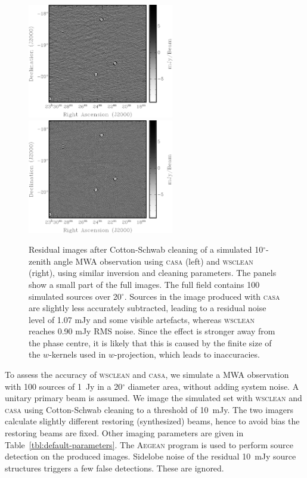 \documentclass[useAMS,usenatbib]{mn2e}
\newcommand{\degree}{\ensuremath{^{\circ}}\xspace}
\begin{document}
\begin{figure}
\begin{center}
\includegraphics[height=5cm]{img/residual-casa-fixed-grayscale}\hspace{1cm}\includegraphics[height=5cm]{img/residual-wsclean}
\caption{Residual images after Cotton-Schwab cleaning of a simulated 10\degree-zenith angle MWA observation using \textsc{casa} (left) and \textsc{wsclean} (right), using similar inversion and cleaning parameters. The panels show a small part of the full images. The full field contains 100 simulated sources over 20\degree. Sources in the image produced with \textsc{casa} are slightly less accurately subtracted, leading to a residual noise level of 1.07 mJy and some visible artefacts, whereas \textsc{wsclean} reaches 0.90 mJy RMS noise. Since the effect is stronger away from the phase centre, it is likely that this is caused by the finite size of the $w$-kernels used in $w$-projection, which leads to inaccuracies.}
\label{fig:residuals}
\end{center}
\end{figure}

To assess the accuracy of \textsc{wsclean} and \textsc{casa}, we simulate a MWA observation with 100 sources of 1~Jy in a 20\degree diameter area, without adding system noise. A unitary primary beam is assumed. We image the simulated set with \textsc{wsclean} and \textsc{casa} using Cotton-Schwab cleaning to a threshold of 10~mJy. The two imagers calculate slightly different restoring (synthesized) beams, hence to avoid bias the restoring beams are fixed. Other imaging parameters are given in Table~\ref{tbl:default-parameters}. The \textsc{Aegean} program \citep{aegean-hancock-2012} is used to perform source detection on the produced images. Sidelobe noise of the residual 10~mJy source structures triggers a few false detections. These are ignored.
\end{document}

